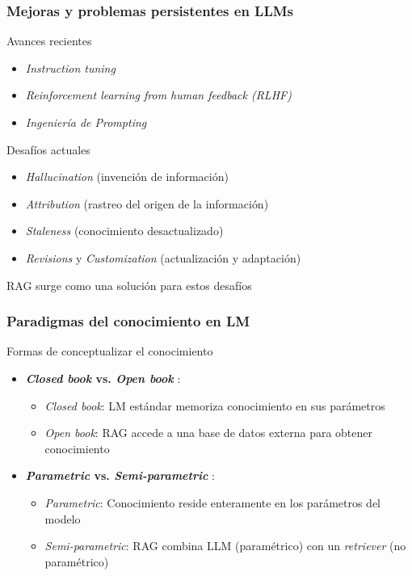 \documentclass[handout]{beamer}
\begin{document}
\begin{frame}
  \frametitle{Mejoras y problemas persistentes en LLMs}
  \begin{block}{Avances recientes}
    \begin{itemize}
      \item \textit{Instruction tuning} 
      \item \textit{Reinforcement learning from human feedback (RLHF)} 
      \item \textit{Ingeniería de Prompting}
    \end{itemize}
  \end{block}
  \begin{alertblock}{Desafíos actuales}
    \begin{itemize}
      \item \textit{Hallucination} (invención de información)
      \item \textit{Attribution} (rastreo del origen de la información)
      \item \textit{Staleness} (conocimiento desactualizado)
      \item \textit{Revisions} y \textit{Customization} (actualización y adaptación)
    \end{itemize}
  \end{alertblock}
  \begin{center}
    RAG surge como una solución para estos desafíos
  \end{center}
\end{frame}

\begin{frame}
  \frametitle{Paradigmas del conocimiento en LM}
  \begin{block}{Formas de conceptualizar el conocimiento}
    \begin{itemize}
      \item \textbf{\textit{Closed book} vs. \textit{Open book}} \parencite{Roberts2020Knowledge}:
            \begin{itemize}
                \item \textit{Closed book}: LM estándar memoriza conocimiento en sus parámetros
                \item \textit{Open book}: RAG accede a una base de datos externa para obtener conocimiento
            \end{itemize}
      \item \textbf{\textit{Parametric} vs. \textit{Semi-parametric}} \parencite{Yogatama2021Adaptive}:
            \begin{itemize}
                \item \textit{Parametric}: Conocimiento reside enteramente en los parámetros del modelo
                \item \textit{Semi-parametric}: RAG combina LLM (paramétrico) con un \textit{retriever} (no paramétrico)
            \end{itemize}
    \end{itemize}
  \end{block}
\end{frame}
\end{document}
